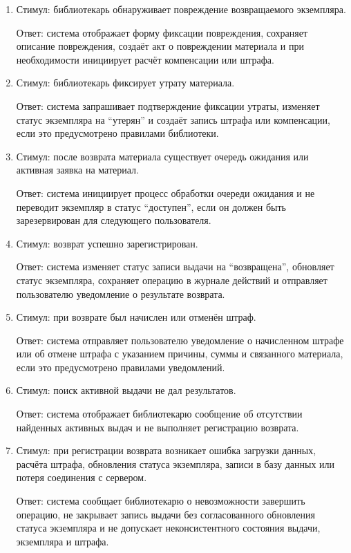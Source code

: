 \documentclass[12pt,a4paper]{article}
\begin{document}
\begin{enumerate}
		\item Стимул: библиотекарь обнаруживает повреждение возвращаемого экземпляра.
		
		Ответ: система отображает форму фиксации повреждения, сохраняет описание
		повреждения, создаёт акт о повреждении материала и при необходимости инициирует
		расчёт компенсации или штрафа.
		
		\item Стимул: библиотекарь фиксирует утрату материала.
		
		Ответ: система запрашивает подтверждение фиксации утраты, изменяет статус
		экземпляра на ``утерян'' и создаёт запись штрафа или компенсации, если это
		предусмотрено правилами библиотеки.
		
		\item Стимул: после возврата материала существует очередь ожидания или активная
		заявка на материал.
		
		Ответ: система инициирует процесс обработки очереди ожидания и не переводит
		экземпляр в статус ``доступен'', если он должен быть зарезервирован для
		следующего пользователя.
		
		\item Стимул: возврат успешно зарегистрирован.
		
		Ответ: система изменяет статус записи выдачи на ``возвращена'', обновляет
		статус экземпляра, сохраняет операцию в журнале действий и отправляет
		пользователю уведомление о результате возврата.
		
		\item Стимул: при возврате был начислен или отменён штраф.
		
		Ответ: система отправляет пользователю уведомление о начисленном штрафе
		или об отмене штрафа с указанием причины, суммы и связанного материала,
		если это предусмотрено правилами уведомлений.
		
		\item Стимул: поиск активной выдачи не дал результатов.
		
		Ответ: система отображает библиотекарю сообщение об отсутствии найденных
		активных выдач и не выполняет регистрацию возврата.
		
		\item Стимул: при регистрации возврата возникает ошибка загрузки данных,
		расчёта штрафа, обновления статуса экземпляра, записи в базу данных или
		потеря соединения с сервером.
		
		Ответ: система сообщает библиотекарю о невозможности завершить операцию,
		не закрывает запись выдачи без согласованного обновления статуса экземпляра
		и не допускает неконсистентного состояния выдачи, экземпляра и штрафа.
	\end{enumerate}
	
\end{document}
